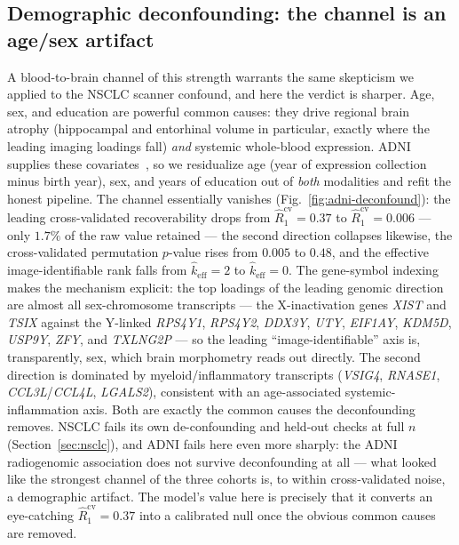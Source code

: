 \documentclass{article}
\begin{document}
\subsection{Demographic deconfounding: the channel is an age/sex artifact}
\label{sec:adni-deconfound}
A blood-to-brain channel of this strength warrants the same skepticism we
applied to the NSCLC scanner confound, and here the verdict is sharper. Age,
sex, and education are powerful common causes: they drive regional brain atrophy
(hippocampal and entorhinal volume in particular, exactly where the leading
imaging loadings fall) \emph{and} systemic whole-blood expression. ADNI supplies
these covariates~\citep{petersen2010adni}, so we residualize age (year of
expression collection minus birth year), sex, and years of education out of
\emph{both} modalities and refit the honest pipeline. The channel essentially
vanishes (Fig.~\ref{fig:adni-deconfound}): the leading cross-validated
recoverability drops from $\hat R_1^{\mathrm{cv}} = 0.37$ to
$\hat R_1^{\mathrm{cv}} = 0.006$ --- only $1.7\%$ of the raw value retained ---
the second direction collapses likewise, the cross-validated permutation
$p$-value rises from $0.005$ to $0.48$, and the effective image-identifiable
rank falls from $\hat k_{\mathrm{eff}} = 2$ to $\hat k_{\mathrm{eff}} = 0$.
The gene-symbol indexing makes the mechanism explicit: the top loadings of the
leading genomic direction are almost all sex-chromosome transcripts --- the
X-inactivation genes \emph{XIST} and \emph{TSIX} against the Y-linked
\emph{RPS4Y1}, \emph{RPS4Y2}, \emph{DDX3Y}, \emph{UTY}, \emph{EIF1AY},
\emph{KDM5D}, \emph{USP9Y}, \emph{ZFY}, and \emph{TXLNG2P} --- so the leading
``image-identifiable'' axis is, transparently, sex, which brain morphometry
reads out directly. The second direction is dominated by myeloid/inflammatory
transcripts (\emph{VSIG4}, \emph{RNASE1}, \emph{CCL3L}/\emph{CCL4L},
\emph{LGALS2}), consistent with an age-associated systemic-inflammation axis.
Both are exactly the common causes the deconfounding removes.
NSCLC fails its own de-confounding and held-out checks at full $n$
(Section~\ref{sec:nsclc}), and ADNI fails here even more sharply: the ADNI
radiogenomic association does not survive deconfounding at all --- what looked
like the strongest channel of the three cohorts is, to within cross-validated
noise, a demographic artifact. The model's value here is precisely that it converts an eye-catching
$\hat R_1^{\mathrm{cv}} = 0.37$ into a calibrated null once the obvious common
causes are removed.
\end{document}
